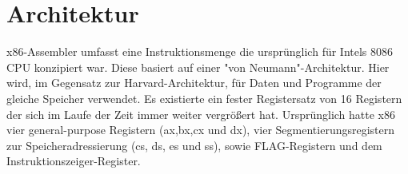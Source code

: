 \section{Architektur}
x86-Assembler umfasst eine Instruktionsmenge die ursprünglich für Intels 8086 CPU konzipiert war. Diese basiert auf einer "von Neumann"-Architektur. Hier wird, im Gegensatz zur Harvard-Architektur, für Daten und Programme der gleiche Speicher verwendet. Es existierte ein fester Registersatz von 16 Registern der sich im Laufe der Zeit immer weiter vergrößert hat. Ursprünglich hatte x86 vier general-purpose Registern (ax,bx,cx und dx), vier Segmentierungsregistern zur Speicheradressierung (cs, ds, es und ss), sowie FLAG-Registern und dem Instruktionszeiger-Register.
